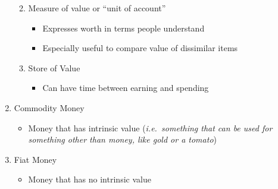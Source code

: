 \documentclass[12pt]{article}
\begin{document}
\begin{enumerate}
\begin{enumerate}
\begin{itemize}
        \end{itemize}

      \item Measure of value or “unit of account”

        \begin{itemize}

          \item Expresses worth in terms people understand

          \item Especially useful to compare value of dissimilar items

        \end{itemize}

      \item Store of Value

        \begin{itemize}

          \item Can have time between earning and spending

        \end{itemize}

    \end{enumerate}

  \item Commodity Money

    \begin{itemize}

      \item Money that has intrinsic value (\textit{i.e.\ something that can be used for something other than money, like gold or a tomato})

    \end{itemize}

  \item Fiat Money

    \begin{itemize}

      \item Money that has no intrinsic value

    \end{itemize}

\end{enumerate}
\end{document}
